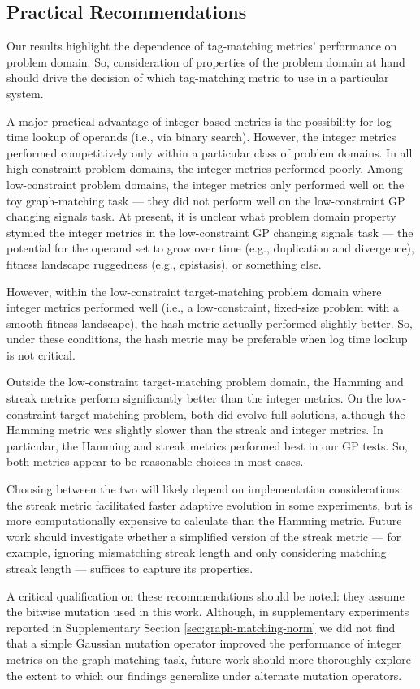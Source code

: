 \subsection{Practical Recommendations}

Our results highlight the dependence of tag-matching metrics' performance on problem domain.
So, consideration of properties of the problem domain at hand should drive the decision of which tag-matching metric to use in a particular system.

A major practical advantage of integer-based metrics is the possibility for log time lookup of operands (i.e., via binary search).
However, the integer metrics performed competitively only within a particular class of problem domains.
In all high-constraint problem domains, the integer metrics performed poorly.
Among low-constraint problem domains, the integer metrics only performed well on the toy graph-matching task --- they did not perform well on the low-constraint GP changing signals task.
At present, it is unclear what problem domain property stymied the integer metrics in the low-constraint GP changing signals task --- the potential for the operand set to grow over time (e.g., duplication and divergence), fitness landscape ruggedness (e.g., epistasis), or something else.

However, within the low-constraint target-matching problem domain where integer metrics performed well (i.e., a low-constraint, fixed-size problem with a smooth fitness landscape), the hash metric actually performed slightly better.
So, under these conditions, the hash metric may be preferable when log time lookup is not critical.

Outside the low-constraint target-matching problem domain, the Hamming and streak metrics perform significantly better than the integer metrics.
On the low-constraint target-matching problem, both did evolve full solutions, although the Hamming metric was slightly slower than the streak and integer metrics.
In particular, the Hamming and streak metrics performed best in our GP tests.
So, both metrics appear to be reasonable choices in most cases.

Choosing between the two will likely depend on implementation considerations: the streak metric facilitated faster adaptive evolution in some experiments, but is more computationally expensive to calculate than the Hamming metric.
Future work should investigate whether a simplified version of the streak metric --- for example, ignoring mismatching streak length and only considering matching streak length --- suffices to capture its properties.

A critical qualification on these recommendations should be noted: they assume the bitwise mutation used in this work.
Although, in supplementary experiments reported in Supplementary Section \ref{sec:graph-matching-norm} we did not find that a simple Gaussian mutation operator improved the performance of integer metrics on the graph-matching task, future work should more thoroughly explore the extent to which our findings generalize under alternate mutation operators.
